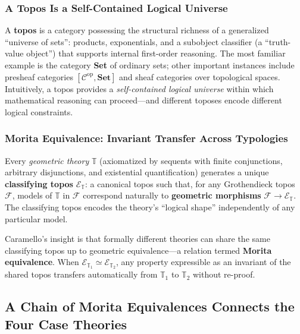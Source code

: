 \documentclass[
]{article}
\begin{document}
\subsubsection{A Topos Is a Self-Contained Logical
Universe}\label{a-topos-is-a-self-contained-logical-universe}

A \textbf{topos} is a category possessing the structural richness of a
generalized ``universe of sets'': products, exponentials, and a
subobject classifier (a ``truth-value object'') that supports internal
first-order reasoning. The most familiar example is the category
\textbf{Set} of ordinary sets; other important instances include
presheaf categories \([\mathcal{C}^{\text{op}}, \mathbf{Set}]\) and
sheaf categories over topological spaces. Intuitively, a topos provides
a \emph{self-contained logical universe} within which mathematical
reasoning can proceed---and different toposes encode different logical
constraints.

\subsubsection{Morita Equivalence: Invariant Transfer Across
Typologies}\label{morita-equivalence-invariant-transfer-across-typologies}

Every \emph{geometric theory} \(\mathbb{T}\) (axiomatized by sequents
with finite conjunctions, arbitrary disjunctions, and existential
quantification) generates a unique \textbf{classifying topos}
\(\mathcal{E}_{\mathbb{T}}\): a canonical topos such that, for any
Grothendieck topos \(\mathcal{F}\), models of \(\mathbb{T}\) in
\(\mathcal{F}\) correspond naturally to \textbf{geometric morphisms}
\(\mathcal{F} \to \mathcal{E}_{\mathbb{T}}\). The classifying topos
encodes the theory's ``logical shape'' independently of any particular
model.

Caramello's insight
\citetext{\citeyear{caramello2016bridges}; \citeyear{caramello2021five}}
is that formally different theories can share the same classifying topos
up to geometric equivalence---a relation termed \textbf{Morita
equivalence}. When
\(\mathcal{E}_{\mathbb{T}_1} \simeq \mathcal{E}_{\mathbb{T}_2}\), any
property expressible as an invariant of the shared topos transfers
automatically from \(\mathbb{T}_1\) to \(\mathbb{T}_2\) without
re-proof.

\subsection{A Chain of Morita Equivalences Connects the Four Case
Theories}\label{a-chain-of-morita-equivalences-connects-the-four-case-theories}
\end{document}

